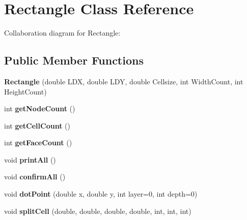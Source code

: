 \hypertarget{class_rectangle}{}\section{Rectangle Class Reference}
\label{class_rectangle}


Collaboration diagram for Rectangle\+:
\subsection*{Public Member Functions}
\begin{DoxyCompactItemize}
\item 
\mbox{\label{class_rectangle_a50c07d8dd5beee5e2ce3a99bb46f9933}} 
{\bfseries Rectangle} (double L\+DX, double L\+DY, double Cellsize, int Width\+Count, int Height\+Count)
\item 
\mbox{\label{class_rectangle_a671028ebe6f7bdf6aeca72698277ad56}} 
int {\bfseries get\+Node\+Count} ()
\item 
\mbox{\label{class_rectangle_ad5d1a52abcdd1e6661acc3046ce9a027}} 
int {\bfseries get\+Cell\+Count} ()
\item 
\mbox{\label{class_rectangle_a36c9dc637716016bd7d50797207f88a9}} 
int {\bfseries get\+Face\+Count} ()
\item 
\mbox{\label{class_rectangle_af2d2b4dc864a7e3ebaab69363cbef645}} 
void {\bfseries print\+All} ()
\item 
\mbox{\label{class_rectangle_a2023a8f33dcd3788059bd1855057382b}} 
void {\bfseries confirm\+All} ()
\item 
\mbox{\label{class_rectangle_a23d8ff6dcfa1bd4cba4edf9bb1e46d6a}} 
void {\bfseries dot\+Point} (double x, double y, int layer=0, int depth=0)
\item 
\mbox{\label{class_rectangle_a05187439d2536f9f02051182393f98b4}} 
void {\bfseries split\+Cell} (double, double, double, double, int, int, int)
\end{DoxyCompactItemize}
